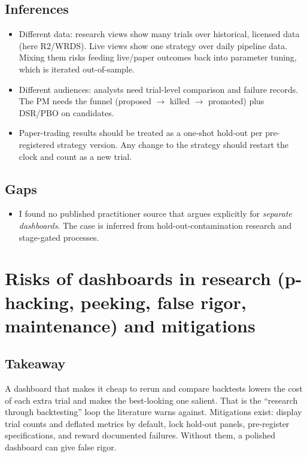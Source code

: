 \documentclass{article}
\begin{document}
\subsection{Inferences}

\begin{itemize}

\item Different data: research views show many trials over historical, licensed data (here R2/\allowbreak{}WRDS). Live views show one strategy over daily pipeline data. Mixing them risks feeding live/\allowbreak{}paper outcomes back into parameter tuning, which is iterated out-of-sample.

\item Different audiences: analysts need trial-level comparison and failure records. The PM needs the funnel (proposed \ensuremath{\rightarrow} killed \ensuremath{\rightarrow} promoted) plus DSR/\allowbreak{}PBO on candidates.

\item Paper-trading results should be treated as a one-shot hold-out per pre-registered strategy version. Any change to the strategy should restart the clock and count as a new trial.

\end{itemize}

\subsection{Gaps}

\begin{itemize}

\item I found no published practitioner source that argues explicitly for \emph{separate dashboards}. The case is inferred from hold-out-contamination research and stage-gated processes.

\end{itemize}

\section{Risks of dashboards in research (p-hacking, peeking, false rigor, maintenance) and mitigations}

\subsection{Takeaway}

A dashboard that makes it cheap to rerun and compare backtests lowers the cost of each extra trial and makes the best-looking one salient. That is the ``research through backtesting'' loop the literature warns against. Mitigations exist: display trial counts and deflated metrics by default, lock hold-out panels, pre-register specifications, and reward documented failures. Without them, a polished dashboard can give false rigor.
\end{document}
